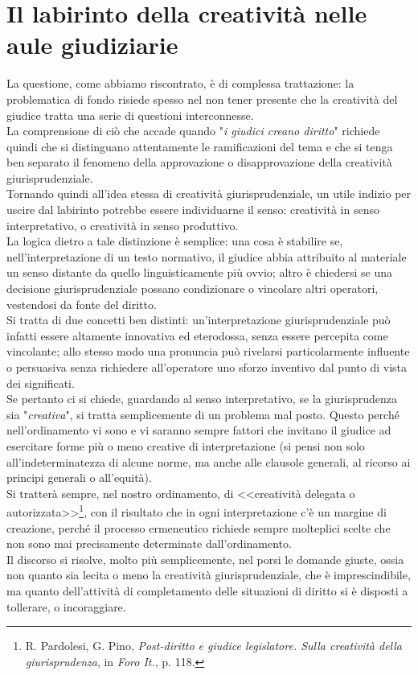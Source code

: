 \section{Il labirinto della creatività nelle aule giudiziarie}
La questione, come abbiamo riscontrato, è di complessa trattazione: la problematica di fondo risiede spesso nel non tener presente che la creatività del giudice tratta una serie di questioni interconnesse.
\\La comprensione di ciò che accade quando "\textit{i giudici creano diritto}" richiede quindi che si distinguano attentamente le ramificazioni del tema e che si tenga ben separato il fenomeno della approvazione o disapprovazione della creatività giurisprudenziale.
\\Tornando quindi all'idea stessa di creatività giurisprudenziale, un utile indizio per uscire dal labirinto potrebbe essere individuarne il senso: creatività in senso interpretativo, o creatività in senso produttivo.
\\La logica dietro a tale distinzione è semplice: una cosa è stabilire se, nell'interpretazione di un testo normativo, il giudice abbia attribuito al materiale un senso distante da quello linguisticamente più ovvio; altro è chiedersi se una decisione giurisprudenziale possano condizionare o vincolare altri operatori, vestendosi da fonte del diritto.
\\Si tratta di due concetti ben distinti: un'interpretazione giurisprudenziale può infatti essere altamente innovativa ed eterodossa, senza essere percepita come vincolante; allo stesso modo una pronuncia può rivelarsi particolarmente influente o persuasiva senza richiedere all'operatore uno sforzo inventivo dal punto di vista dei significati.
\\Se pertanto ci si chiede, guardando al senso interpretativo, se la giurisprudenza sia "\textit{creativa}", si tratta semplicemente di un problema mal posto.
Questo perché nell'ordinamento vi sono e vi saranno sempre fattori che invitano il giudice ad esercitare forme più o meno creative di interpretazione (si pensi non solo all'indeterminatezza di alcune norme, ma anche alle clausole generali, al ricorso ai principi generali o all'equità).
\\Si tratterà sempre, nel nostro ordinamento, di <<creatività delegata o autorizzata>>\footnote{R. Pardolesi, G. Pino, \textit{Post-diritto e giudice legislatore. Sulla creatività della giurisprudenza}, in \textit{Foro It.}, p. 118.}, con il risultato che in ogni interpretazione c'è un margine di creazione, perché il processo ermeneutico richiede sempre molteplici scelte che non sono mai precisamente determinate dall'ordinamento.
\\Il discorso si risolve, molto più semplicemente, nel porsi le domande giuste, ossia non quanto sia lecita o meno la creatività giurisprudenziale, che è imprescindibile, ma quanto dell'attività di completamento delle situazioni di diritto si è disposti a tollerare, o incoraggiare.